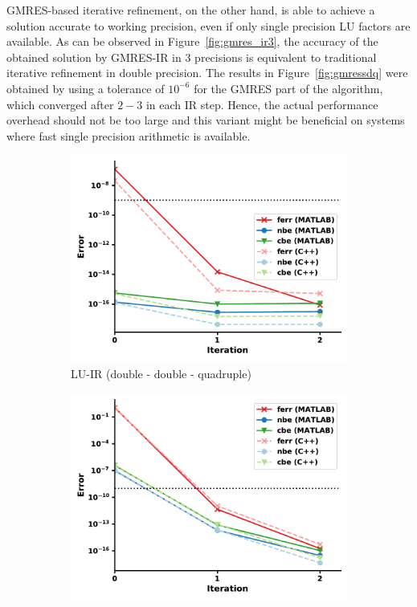 GMRES-based iterative refinement, on the other hand, is able to achieve a solution accurate to working precision, even if only single precision LU factors are available. As can be observed in Figure~\hyperref[fig:gmres_ir3]{\ref{fig:gmres_ir3}}, the accuracy of the obtained solution by GMRES-IR in 3 precisions is equivalent to traditional iterative refinement in double precision. The results in Figure~\hyperref[fig:gmressdq]{\ref{fig:gmressdq}} were obtained by using a tolerance of $10^{-6}$ for the GMRES part of the algorithm, which converged after $2-3$ in each IR step. Hence, the actual performance overhead should not be too large and this variant might be beneficial on systems where fast single precision arithmetic is available.

\begin{figure}[h]
\centering
\begin{subfigure}{.5\textwidth}
  \centering
  \includegraphics[width=\linewidth]{chapters/5_experiments/figures/LUddq.pdf}
  \caption{LU-IR (double - double - quadruple)}
  \label{fig:luddq}
\end{subfigure}%
\begin{subfigure}{.5\textwidth}
  \centering
  \includegraphics[width=\linewidth]{chapters/5_experiments/figures/GMRESsdq.pdf}

\end{subfigure}
\end{figure}
